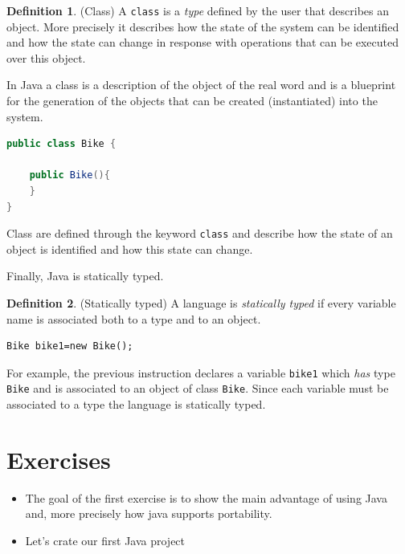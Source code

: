 \documentclass{article}
\theoremstyle{definition}
\newtheorem{mydef}{Definition}
\begin{document}
\begin{mydef} (Class) A \texttt{class} is a \emph{type} defined by the user that describes an object. More precisely it describes how the state of the system can be identified and how the state can change in response with operations that can be executed over this object.
\end{mydef}

In Java a class is a description of the object of the real word and is a blueprint for the generation of the objects that can be created (instantiated) into the system. 

\begin{lstlisting}[language=Java,escapechar=|]
public class Bike {

	public Bike(){
	}
}
\end{lstlisting}
Class are defined through the keyword \texttt{class} and describe how the state of an object is identified and how this state can change.

Finally, Java is statically typed.
\begin{mydef} (Statically typed) A language is \emph{statically typed} if every variable name is associated both
to a type and to an object.
\end{mydef}
\begin{lstlisting}
Bike bike1=new Bike();
\end{lstlisting}
For example, the previous instruction declares a variable \texttt{bike1} which \emph{has} type \texttt{Bike} and is associated to an object of class \texttt{Bike}. Since each variable must be associated to a type the language is statically typed.

\section{Exercises}
\begin{itemize}
\item The goal of the first exercise is to show the main advantage of using Java and, more precisely how java supports portability.
\item Let's crate our first Java project
\end{itemize}
\end{document}
